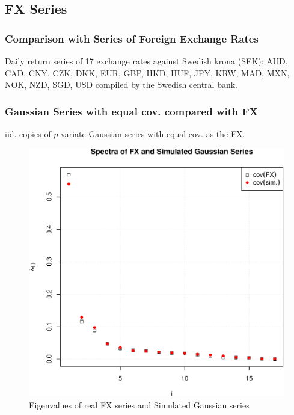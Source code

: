 \documentclass{beamer}
\begin{document}
\subsection{FX Series}
\begin{frame}
  \frametitle{Comparison with Series of Foreign Exchange Rates}
  Daily return series of 17 exchange rates against Swedish krona (SEK):
  AUD,
  CAD,
  CNY,
  CZK,
  DKK,
  EUR,
  GBP,
  HKD,
  HUF,
  JPY,
  KRW,
  MAD,
  MXN,
  NOK,
  NZD,
  SGD,
  USD
  compiled by the Swedish central bank.
\end{frame}

\begin{frame}
  \frametitle{Gaussian Series with equal cov. compared with FX}
  \begin{minipage}{0.5\linewidth}
    iid. copies of $p$-variate Gaussian series with equal cov. as the FX.
  \end{minipage}\hfill
  \begin{minipage}{0.5\linewidth}
  \begin{figure}[htb!]
    \centering
    \includegraphics[width=1.0\linewidth]{Gaussian_eigenvalues.pdf}
    \caption{\scriptsize Eigenvalues of real FX series and Simulated Gaussian series}
  \end{figure}
  \end{minipage}
\end{frame}
\end{document}
